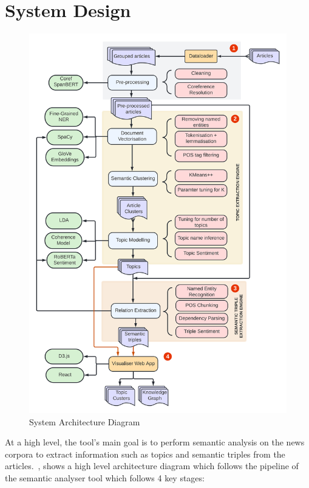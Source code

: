 \section{System Design}

\begin{figure}[H]
\centering
\includegraphics[width=0.7\linewidth]{images/system_arch.png}
\caption{System Architecture Diagram}
\label{fig:sys_arch}
\end{figure}
At a high level, the tool's main goal is to perform semantic analysis on the news corpora to extract information such as topics and semantic triples from the articles.~, shows a high level architecture diagram which follows the pipeline of the semantic analyser tool which follows 4 key stages: 


